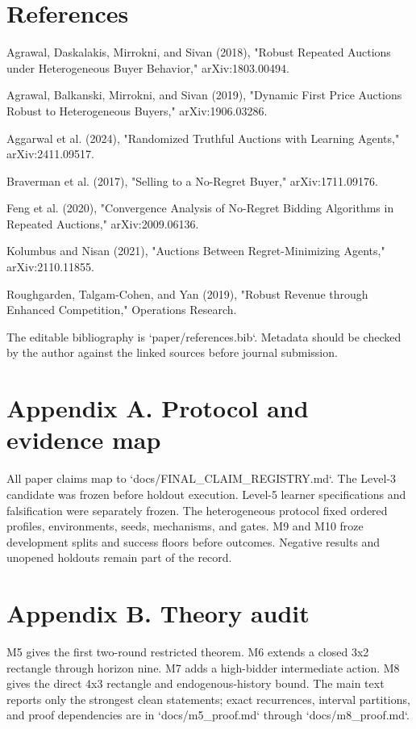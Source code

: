 \documentclass[11pt]{article}
\begin{document}
\section{References}
Agrawal, Daskalakis, Mirrokni, and Sivan (2018), "Robust Repeated Auctions under Heterogeneous Buyer Behavior," arXiv:1803.00494.

Agrawal, Balkanski, Mirrokni, and Sivan (2019), "Dynamic First Price Auctions Robust to Heterogeneous Buyers," arXiv:1906.03286.

Aggarwal et al. (2024), "Randomized Truthful Auctions with Learning Agents," arXiv:2411.09517.

Braverman et al. (2017), "Selling to a No-Regret Buyer," arXiv:1711.09176.

Feng et al. (2020), "Convergence Analysis of No-Regret Bidding Algorithms in Repeated Auctions," arXiv:2009.06136.

Kolumbus and Nisan (2021), "Auctions Between Regret-Minimizing Agents," arXiv:2110.11855.

Roughgarden, Talgam-Cohen, and Yan (2019), "Robust Revenue through Enhanced Competition," Operations Research.

The editable bibliography is `paper/references.bib`. Metadata should be checked by the author against the linked sources before journal submission.

\section{Appendix A. Protocol and evidence map}
All paper claims map to `docs/FINAL_CLAIM_REGISTRY.md`. The Level-3 candidate was frozen before holdout execution. Level-5 learner specifications and falsification were separately frozen. The heterogeneous protocol fixed ordered profiles, environments, seeds, mechanisms, and gates. M9 and M10 froze development splits and success floors before outcomes. Negative results and unopened holdouts remain part of the record.

\section{Appendix B. Theory audit}
M5 gives the first two-round restricted theorem. M6 extends a closed 3x2 rectangle through horizon nine. M7 adds a high-bidder intermediate action. M8 gives the direct 4x3 rectangle and endogenous-history bound. The main text reports only the strongest clean statements; exact recurrences, interval partitions, and proof dependencies are in `docs/m5_proof.md` through `docs/m8_proof.md`.
\end{document}
